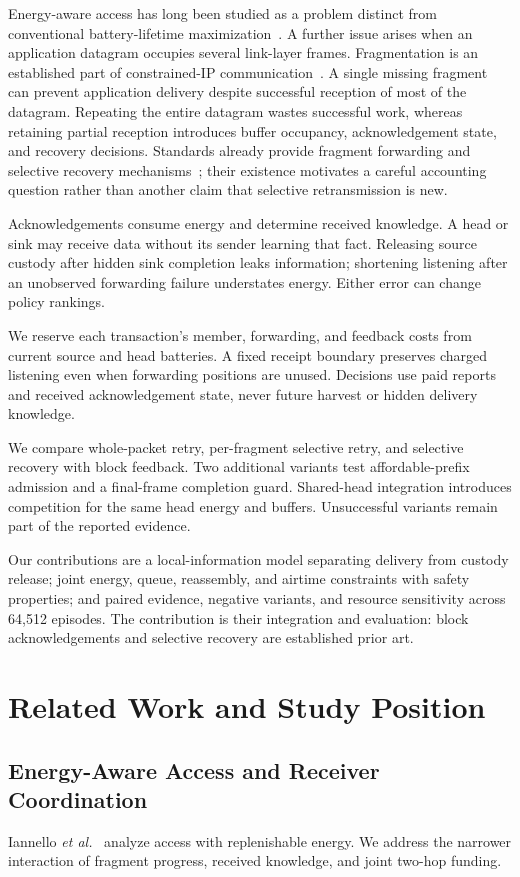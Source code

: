 \documentclass[journal,10pt]{IEEEtran}
\begin{document}
Energy-aware access has long been studied as a problem distinct from conventional battery-lifetime maximization~\cite{iannello}. A further issue arises when an application datagram occupies several link-layer frames. Fragmentation is an established part of constrained-IP communication~\cite{rfc4944}. A single missing fragment can prevent application delivery despite successful reception of most of the datagram. Repeating the entire datagram wastes successful work, whereas retaining partial reception introduces buffer occupancy, acknowledgement state, and recovery decisions. Standards already provide fragment forwarding and selective recovery mechanisms~\cite{rfc8930,rfc8931}; their existence motivates a careful accounting question rather than another claim that selective retransmission is new.

Acknowledgements consume energy and determine received knowledge. A head or sink may receive data without its sender learning that fact. Releasing source custody after hidden sink completion leaks information; shortening listening after an unobserved forwarding failure understates energy. Either error can change policy rankings.

We reserve each transaction's member, forwarding, and feedback costs from current source and head batteries. A fixed receipt boundary preserves charged listening even when forwarding positions are unused. Decisions use paid reports and received acknowledgement state, never future harvest or hidden delivery knowledge.

We compare whole-packet retry, per-fragment selective retry, and selective recovery with block feedback. Two additional variants test affordable-prefix admission and a final-frame completion guard. Shared-head integration introduces competition for the same head energy and buffers. Unsuccessful variants remain part of the reported evidence.

Our contributions are a local-information model separating delivery from custody release; joint energy, queue, reassembly, and airtime constraints with safety properties; and paired evidence, negative variants, and resource sensitivity across 64,512 episodes. The contribution is their integration and evaluation: block acknowledgements and selective recovery are established prior art.

\section{Related Work and Study Position}
\subsection{Energy-Aware Access and Receiver Coordination}
Iannello \emph{et al.}~\cite{iannello} analyze access with replenishable energy. We address the narrower interaction of fragment progress, received knowledge, and joint two-hop funding.
\end{document}
